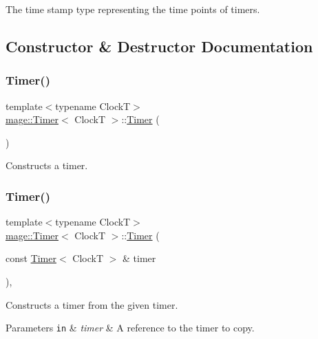 The time stamp type representing the time points of timers. 

\subsection{Constructor \& Destructor Documentation}
\hypertarget{classmage_1_1_timer_afdc4024388d57bbdda74854ee8a11683}{}\label{classmage_1_1_timer_afdc4024388d57bbdda74854ee8a11683} 
\subsubsection{\texorpdfstring{Timer()}{Timer()}\hspace{0.1cm}{\footnotesize\ttfamily [1/3]}}
{\footnotesize\ttfamily template$<$typename ClockT$>$ \\
\hyperlink{classmage_1_1_timer}{mage\+::\+Timer}$<$ ClockT $>$\+::\hyperlink{classmage_1_1_timer}{Timer} (\begin{DoxyParamCaption}{ }\end{DoxyParamCaption})\hspace{0.3cm}{\ttfamily [noexcept]}}

Constructs a timer. \hypertarget{classmage_1_1_timer_a69aa4becb39ab40f378bd110db8ceb84}{}\label{classmage_1_1_timer_a69aa4becb39ab40f378bd110db8ceb84} 
\subsubsection{\texorpdfstring{Timer()}{Timer()}\hspace{0.1cm}{\footnotesize\ttfamily [2/3]}}
{\footnotesize\ttfamily template$<$typename ClockT$>$ \\
\hyperlink{classmage_1_1_timer}{mage\+::\+Timer}$<$ ClockT $>$\+::\hyperlink{classmage_1_1_timer}{Timer} (\begin{DoxyParamCaption}\item[{const \hyperlink{classmage_1_1_timer}{Timer}$<$ ClockT $>$ \&}]{timer }\end{DoxyParamCaption})\hspace{0.3cm}{\ttfamily [default]}, {\ttfamily [noexcept]}}

Constructs a timer from the given timer.


\begin{DoxyParams}[1]{Parameters}
\mbox{\tt in}  & {\em timer} & A reference to the timer to copy. \\
\hline
\end{DoxyParams}
\hypertarget{classmage_1_1_timer_a7fb565cbe34c04df2713c43d3341cbc4}{}\label{classmage_1_1_timer_a7fb565cbe34c04df2713c43d3341cbc4} 
